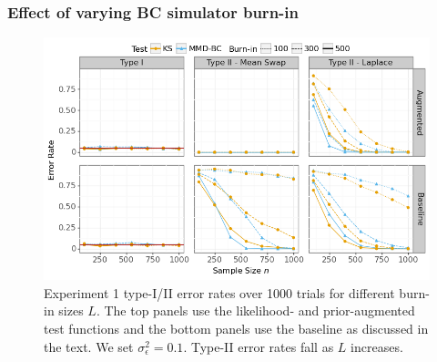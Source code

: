 \subsubsection{Effect of varying BC simulator burn-in}
\begin{figure}[H]
    \centering
    \includegraphics[width=\textwidth]{figures/results_1b.png}
    \caption{Experiment 1 type-I/II error rates over 1000 trials for different burn-in sizes $L$. The top panels use the likelihood- and prior-augmented test functions and the bottom panels use the baseline as discussed in the text. We set $\sigma_{\epsilon}^{2}=0.1$. Type-II error rates fall as $L$ increases.}
    \label{fig:ex2b}
\end{figure}

